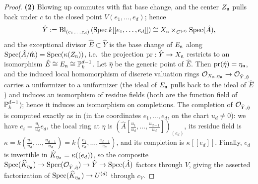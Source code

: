 \begin{proof}
    \textbf{(2)} Blowing up commutes with flat base change, and the center $Z_{\mathfrak{n}}$ pulls back under $c$ to the closed
    point $V(e_1, \dots, e_d)$; hence
    $$\hat{Y} := \operatorname{Bl}_{(e_1, \dots, e_d)}\left(\operatorname{Spec} k[[e_1, \dots, e_d]]\right) \cong X_{\mathfrak{n}} \times_{C^{(d)}} \operatorname{Spec}(\hat{A}),$$
    and the exceptional divisor $\hat{E} \subset \hat{Y}$ is the base change of $E_{\mathfrak{n}}$ along
    $\operatorname{Spec}(\hat{A}/\hat{\mathfrak{m}}) = \operatorname{Spec}(\kappa(Z_{\mathfrak{n}}))$, i.e.\ the projection $\mathrm{pr}: \hat{Y} \to X_{\mathfrak{n}}$
    restricts to an isomorphism $\hat{E} \cong E_{\mathfrak{n}} \cong \mathbb{P}_k^{d-1}$.
    Let $\hat{\eta}$ be the generic point of $\hat{E}$. Then $\mathrm{pr}(\hat\eta) = \eta_{\mathfrak{n}}$, and the induced local
    homomorphism of discrete valuation rings $\mathcal{O}_{X_{\mathfrak{n}}, \eta_{\mathfrak{n}}} \to \mathcal{O}_{\hat{Y}, \hat{\eta}}$ carries a uniformizer
    to a uniformizer (the ideal of $E_{\mathfrak{n}}$ pulls back to the ideal of $\hat{E}$) and induces an isomorphism of residue
    fields (both are the function field of $\mathbb{P}_k^{d-1}$); hence it induces an isomorphism on completions.
    The completion of $\mathcal{O}_{\hat{Y}, \hat{\eta}}$ is computed exactly as in
     (in the coordinates $e_1, \dots, e_d$, on the chart $u_d \neq 0$):
    we have $e_i = \frac{u_i}{u_d} e_d$, the local ring at
    $\hat\eta$ is $\left(\hat{A}[\frac{u_1}{u_d}, \dots, \frac{u_{d-1}}{u_d}]\right)_{(e_d)}$, its residue field is
    $\kappa = k(\frac{u_1}{u_d}, \dots, \frac{u_{d-1}}{u_d}) = k(\frac{e_1}{e_d}, \dots, \frac{e_{d-1}}{e_d})$, and its
    completion is $\kappa[[e_d]]$.
    Finally, $e_d$ is invertible in $\widehat{K}_{\eta_{\mathfrak{n}}} = \kappa((e_d))$, so the composite
    $\operatorname{Spec}(\widehat{K}_{\eta_{\mathfrak{n}}}) \to \operatorname{Spec}(\mathcal{O}_{\hat{Y}, \hat\eta}) \to \hat{Y} \to \operatorname{Spec}(\hat{A})$ factors through $V$,
    giving the asserted factorization of $\operatorname{Spec}(\widehat{K}_{\eta_{\mathfrak{n}}}) \to U^{(d)}$ through $c_V$.


\end{proof}
